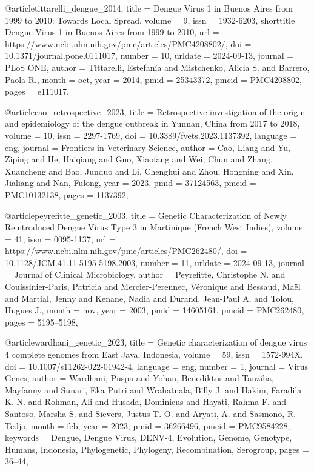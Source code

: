 \documentclass[german,version-2022-01]{uzl-thesis}
\begin{document}
\begin{bibtex-entries}
@article{tittarelli_dengue_2014,
	title = {Dengue {Virus} 1 in {Buenos} {Aires} from 1999 to 2010: {Towards} {Local} {Spread}},
	volume = {9},
	issn = {1932-6203},
	shorttitle = {Dengue {Virus} 1 in {Buenos} {Aires} from 1999 to 2010},
	url = {https://www.ncbi.nlm.nih.gov/pmc/articles/PMC4208802/},
	doi = {10.1371/journal.pone.0111017},
	number = {10},
	urldate = {2024-09-13},
	journal = {PLoS ONE},
	author = {Tittarelli, Estefan\'{i}a and Mistchenko, Alicia S. and Barrero, Paola R.},
	month = oct,
	year = {2014},
	pmid = {25343372},
	pmcid = {PMC4208802},
	pages = {e111017},
}

@article{cao_retrospective_2023,
	title = {Retrospective investigation of the origin and epidemiology of the dengue outbreak in {Yunnan}, {China} from 2017 to 2018},
	volume = {10},
	issn = {2297-1769},
	doi = {10.3389/fvets.2023.1137392},
	language = {eng},
	journal = {Frontiers in Veterinary Science},
	author = {Cao, Liang and Yu, Ziping and He, Haiqiang and Guo, Xiaofang and Wei, Chun and Zhang, Xuancheng and Bao, Junduo and Li, Chenghui and Zhou, Hongning and Xin, Jialiang and Nan, Fulong},
	year = {2023},
	pmid = {37124563},
	pmcid = {PMC10132138},
	pages = {1137392},
}

@article{peyrefitte_genetic_2003,
	title = {Genetic {Characterization} of {Newly} {Reintroduced} {Dengue} {Virus} {Type} 3 in {Martinique} ({French} {West} {Indies})},
	volume = {41},
	issn = {0095-1137},
	url = {https://www.ncbi.nlm.nih.gov/pmc/articles/PMC262480/},
	doi = {10.1128/JCM.41.11.5195-5198.2003},
	number = {11},
	urldate = {2024-09-13},
	journal = {Journal of Clinical Microbiology},
	author = {Peyrefitte, Christophe N. and Couissinier-Paris, Patricia and Mercier-Perennec, V\'{e}ronique and Bessaud, Ma\"{e}l and Martial, Jenny and Kenane, Nadia and Durand, Jean-Paul A. and Tolou, Hugues J.},
	month = nov,
	year = {2003},
	pmid = {14605161},
	pmcid = {PMC262480},
	pages = {5195--5198},
}

@article{wardhani_genetic_2023,
	title = {Genetic characterization of dengue virus 4 complete genomes from {East} {Java}, {Indonesia}},
	volume = {59},
	issn = {1572-994X},
	doi = {10.1007/s11262-022-01942-4},
	language = {eng},
	number = {1},
	journal = {Virus Genes},
	author = {Wardhani, Puspa and Yohan, Benediktus and Tanzilia, Mayfanny and Sunari, Eka Putri and Wrahatnala, Billy J. and Hakim, Faradila K. N. and Rohman, Ali and Husada, Dominicus and Hayati, Rahma F. and Santoso, Marsha S. and Sievers, Justus T. O. and Aryati, A. and Sasmono, R. Tedjo},
	month = feb,
	year = {2023},
	pmid = {36266496},
	pmcid = {PMC9584228},
	keywords = {Dengue, Dengue Virus, DENV-4, Evolution, Genome, Genotype, Humans, Indonesia, Phylogenetic, Phylogeny, Recombination, Serogroup},
	pages = {36--44},
}


\end{bibtex-entries}
\end{document}
